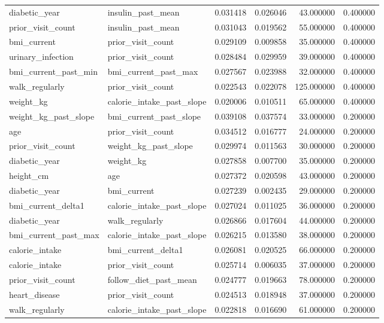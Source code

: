\begin{longtable}{llrrrr}
diabetic\_year & insulin\_past\_mean & 0.031418 & 0.026046 & 43.000000 & 0.400000 \\
prior\_visit\_count & insulin\_past\_mean & 0.031043 & 0.019562 & 55.000000 & 0.400000 \\
bmi\_current & prior\_visit\_count & 0.029109 & 0.009858 & 35.000000 & 0.400000 \\
urinary\_infection & prior\_visit\_count & 0.028484 & 0.029959 & 39.000000 & 0.400000 \\
bmi\_current\_past\_min & bmi\_current\_past\_max & 0.027567 & 0.023988 & 32.000000 & 0.400000 \\
walk\_regularly & prior\_visit\_count & 0.022543 & 0.022078 & 125.000000 & 0.400000 \\
weight\_kg & calorie\_intake\_past\_slope & 0.020006 & 0.010511 & 65.000000 & 0.400000 \\
weight\_kg\_past\_slope & bmi\_current\_past\_slope & 0.039108 & 0.037574 & 33.000000 & 0.200000 \\
age & prior\_visit\_count & 0.034512 & 0.016777 & 24.000000 & 0.200000 \\
prior\_visit\_count & weight\_kg\_past\_slope & 0.029974 & 0.011563 & 30.000000 & 0.200000 \\
diabetic\_year & weight\_kg & 0.027858 & 0.007700 & 35.000000 & 0.200000 \\
height\_cm & age & 0.027372 & 0.020598 & 43.000000 & 0.200000 \\
diabetic\_year & bmi\_current & 0.027239 & 0.002435 & 29.000000 & 0.200000 \\
bmi\_current\_delta1 & calorie\_intake\_past\_slope & 0.027024 & 0.011025 & 36.000000 & 0.200000 \\
diabetic\_year & walk\_regularly & 0.026866 & 0.017604 & 44.000000 & 0.200000 \\
bmi\_current\_past\_max & calorie\_intake\_past\_slope & 0.026215 & 0.013580 & 38.000000 & 0.200000 \\
calorie\_intake & bmi\_current\_delta1 & 0.026081 & 0.020525 & 66.000000 & 0.200000 \\
calorie\_intake & prior\_visit\_count & 0.025714 & 0.006035 & 37.000000 & 0.200000 \\
prior\_visit\_count & follow\_diet\_past\_mean & 0.024777 & 0.019663 & 78.000000 & 0.200000 \\
heart\_disease & prior\_visit\_count & 0.024513 & 0.018948 & 37.000000 & 0.200000 \\
walk\_regularly & calorie\_intake\_past\_slope & 0.022818 & 0.016690 & 61.000000 & 0.200000 \\

\end{longtable}
